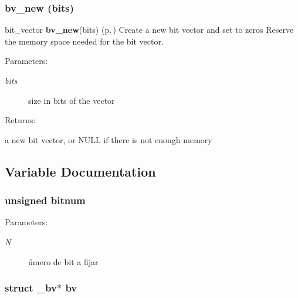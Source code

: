 \subsubsection{ bv\_\-new (bits)}\label{P__bits_8c_a6}


bit\_\-vector {\bf bv\_\-new}(bits) {\rm (p.\,\pageref{P__bits_8c_a6})} Create a new bit vector and set to zeros Reserve the memory space needed for the bit vector.

\begin{Desc}
\item[Parameters: ]\par
\begin{description}
\item[{\em 
bits}]size in bits of the vector \end{description}
\end{Desc}
\begin{Desc}
\item[Returns: ]\par
a new bit vector, or NULL if there is not enough memory \end{Desc}


\subsection{Variable Documentation}
\subsubsection{\setlength{\rightskip}{0pt plus 5cm}unsigned bitnum}\label{P__bits_8c_a2}


\begin{Desc}
\item[Parameters: ]\par
\begin{description}
\item[{\em 
N}]\'{u}mero de bit a fijar \end{description}
\end{Desc}
\subsubsection{\setlength{\rightskip}{0pt plus 5cm}struct {\bf \_\-bv}$\ast$ bv}\label{P__bits_8c_a5}


